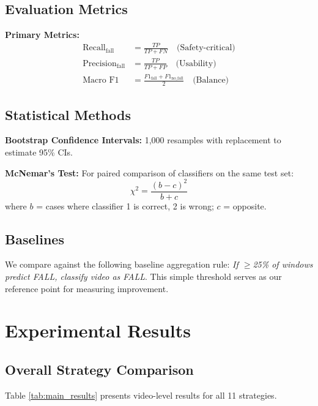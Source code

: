 \documentclass[conference]{IEEEtran}
\begin{document}
\subsection{Evaluation Metrics}

\textbf{Primary Metrics:}
\begin{align}
\text{Recall}_{\text{fall}} &= \frac{TP}{TP + FN} \quad \text{(Safety-critical)} \\
\text{Precision}_{\text{fall}} &= \frac{TP}{TP + FP} \quad \text{(Usability)} \\
\text{Macro F1} &= \frac{F1_{\text{fall}} + F1_{\text{no\_fall}}}{2} \quad \text{(Balance)}
\end{align}

\subsection{Statistical Methods}

\textbf{Bootstrap Confidence Intervals:} 1,000 resamples with replacement to estimate 95\% CIs.

\textbf{McNemar's Test:} For paired comparison of classifiers on the same test set:
\begin{equation}
\chi^2 = \frac{(b - c)^2}{b + c}
\end{equation}
where $b$ = cases where classifier 1 is correct, 2 is wrong; $c$ = opposite.

\subsection{Baselines}

We compare against the following baseline aggregation rule: \textit{If $\geq$25\% of windows predict FALL, classify video as FALL}. This simple threshold serves as our reference point for measuring improvement.

\section{Experimental Results}

\subsection{Overall Strategy Comparison}

Table \ref{tab:main_results} presents video-level results for all 11 strategies.
\end{document}
